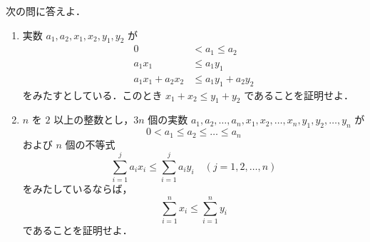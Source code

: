 \documentclass[a4paper,10pt]{ltjsarticle}
\begin{document}
\begin{oframed}
  次の問に答えよ．
  \begin{enumerate}
    \item 実数 $a_1, a_2, x_1, x_2, y_1, y_2$ が
          \begin{align*} 0 &< a_1 \le a_2 \\ a_1 x_1 &\le a_1 y_1 \\ a_1 x_1 + a_2 x_2 &\le a_1 y_1 + a_2 y_2 \end{align*}
          をみたすとしている．このとき $x_1 + x_2 \le y_1 + y_2$ であることを証明せよ．
    \item $n$ を $2$ 以上の整数とし，$3n$ 個の実数 $a_1, a_2, \dots, a_n, x_1, x_2, \dots, x_n, y_1, y_2, \dots, y_n$ が
          \[ 0 < a_1 \le a_2 \le \dots \le a_n \]
          および $n$ 個の不等式
          \[ \sum_{i=1}^j a_i x_i \le \sum_{i=1}^j a_i y_i \quad (j=1, 2, \dots, n) \]
          をみたしているならば，
          \[ \sum_{i=1}^n x_i \le \sum_{i=1}^n y_i \]
          であることを証明せよ．
  \end{enumerate}
\end{oframed}
\setlength{\columnseprule}{0.4pt}
\end{document}
